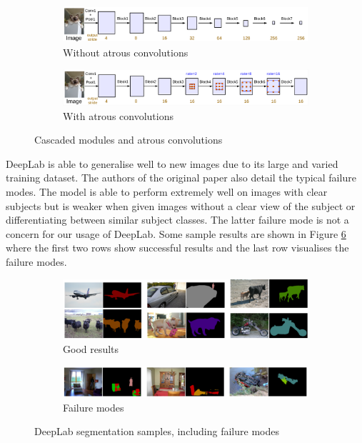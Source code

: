 \documentclass{article}
\begin{document}
\begin{figure}[h!]
  \centering
  \begin{subfigure}{\textwidth}
    \includegraphics[width=\textwidth]{images/deeplabnoatrous.png}
    \caption{Without atrous convolutions}
    \label{deeplabnoatrous}
  \end{subfigure}
  \begin{subfigure}{\textwidth}
    \includegraphics[width=\textwidth]{images/deeplabatrous.png}
    \caption{With atrous convolutions}
    \label{deeplabatrous}
  \end{subfigure}
  \caption{Cascaded modules and atrous convolutions \parencite{deeplab}}
  \label{deeplabatrousnoatrous}
\end{figure}

DeepLab is able to generalise well to new images due to its large and varied training dataset. The authors of the original paper also detail the typical failure modes. The model is able to perform extremely well on images with clear subjects but is weaker when given images without a clear view of the subject or differentiating between similar subject classes. The latter failure mode is not a concern for our usage of DeepLab. Some sample results are shown in Figure \ref{deeplabresults} where the first two rows show successful results and the last row visualises the failure modes.

\begin{figure}[h!]
  \centering
  \begin{subfigure}{\textwidth}
    \includegraphics[width=\textwidth]{images/deeplabresultsgood.png}
    \caption{Good results}
    \label{deeplabresultsgood}
  \end{subfigure}
  \begin{subfigure}{\textwidth}
    \includegraphics[width=\textwidth]{images/deeplabresultsbad.png}
    \caption{Failure modes}
    \label{deeplabresultsbad}
  \end{subfigure}
  \caption{DeepLab segmentation samples, including failure modes \parencite{deeplab}}
  \label{deeplabresults}
\end{figure}
\end{document}
